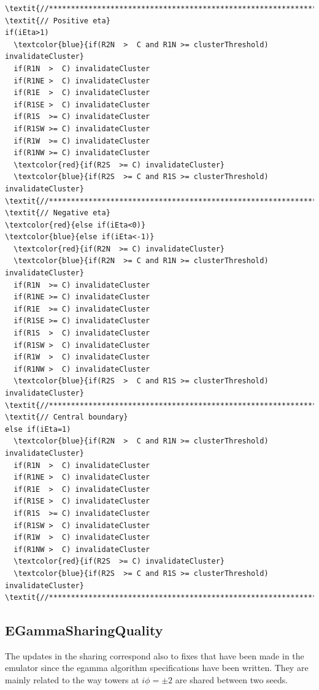 \documentclass[a4paper, 12pt]{article}
\begin{document}
\begin{Verbatim}[label={Filtering updates}]
\textit{//******************************************************************//}
\textit{// Positive eta}
if(iEta>1) 
  \textcolor{blue}{if(R2N  >  C and R1N >= clusterThreshold) invalidateCluster}
  if(R1N  >  C) invalidateCluster
  if(R1NE >  C) invalidateCluster
  if(R1E  >  C) invalidateCluster
  if(R1SE >  C) invalidateCluster
  if(R1S  >= C) invalidateCluster
  if(R1SW >= C) invalidateCluster
  if(R1W  >= C) invalidateCluster
  if(R1NW >= C) invalidateCluster
  \textcolor{red}{if(R2S  >= C) invalidateCluster}
  \textcolor{blue}{if(R2S  >= C and R1S >= clusterThreshold) invalidateCluster}
\textit{//******************************************************************//}
\textit{// Negative eta}
\textcolor{red}{else if(iEta<0)}
\textcolor{blue}{else if(iEta<-1)}
  \textcolor{red}{if(R2N  >= C) invalidateCluster}
  \textcolor{blue}{if(R2N  >= C and R1N >= clusterThreshold) invalidateCluster}
  if(R1N  >= C) invalidateCluster
  if(R1NE >= C) invalidateCluster
  if(R1E  >= C) invalidateCluster
  if(R1SE >= C) invalidateCluster
  if(R1S  >  C) invalidateCluster
  if(R1SW >  C) invalidateCluster
  if(R1W  >  C) invalidateCluster
  if(R1NW >  C) invalidateCluster
  \textcolor{blue}{if(R2S  >  C and R1S >= clusterThreshold) invalidateCluster}
\textit{//******************************************************************//}
\textit{// Central boundary}
else if(iEta=1)
  \textcolor{blue}{if(R2N  >  C and R1N >= clusterThreshold) invalidateCluster}
  if(R1N  >  C) invalidateCluster
  if(R1NE >  C) invalidateCluster
  if(R1E  >  C) invalidateCluster
  if(R1SE >  C) invalidateCluster
  if(R1S  >= C) invalidateCluster
  if(R1SW >  C) invalidateCluster
  if(R1W  >  C) invalidateCluster
  if(R1NW >  C) invalidateCluster
  \textcolor{red}{if(R2S  >= C) invalidateCluster}
  \textcolor{blue}{if(R2S  >= C and R1S >= clusterThreshold) invalidateCluster}
\textit{//******************************************************************//}
\end{Verbatim}


\subsection{EGammaSharingQuality}\label{sec:sharing1}
The updates in the sharing correspond also to fixes that have been made in the emulator since the egamma algorithm specifications have been written. They are mainly related to the way towers at $i\phi=\pm2$ are shared between two seeds.
\end{document}
